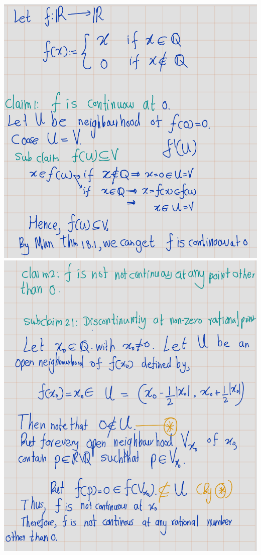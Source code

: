 \documentclass[
]{book}
\theoremstyle{definition}
\theoremstyle{definition}
\theoremstyle{definition}
\theoremstyle{definition}
\theoremstyle{remark}
\begin{document}
\includegraphics{figures/Exercises/Ex 2.18/ex-6-1.png}
\includegraphics{figures/Exercises/Ex 2.18/ex-6-2.png}
\end{document}
